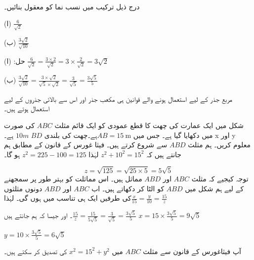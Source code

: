 درج ذیل ترکیب میں نسب نما کو معقول بنائیں۔

(ا)
\(\frac{6}{\sqrt{2}}\)

(ب)
\(\frac{3\sqrt{2}}{\sqrt{10}}\)

حل:
(ا)
\(\frac{6}{\sqrt{2}}=\frac{3\times 2}{\sqrt{2}}=3\times\frac{2}{\sqrt{2}}=3\sqrt{2}\)

(ب)
\(\frac{3\sqrt{2}}{\sqrt{10}}=\frac{3\times\sqrt{2}}{\sqrt{5}\times\sqrt{2}}=\frac{3}{\sqrt{5}}=\frac{3\sqrt{5}}{5}\)

مربع جذر کے لیے استعمال ہونے والے قوانین ہی مکعب جذر اور اس سے بالائی جذروں کے لیے استعمال ہوتے ہیں۔

شکل  میں ایک عمارت کی چھت کا قطع عمودی کو ایک قائم مثلث \(ABC\) کی صورت میں دکھایا گیا ہے۔ جس میں
 \(AB=\SI{15}{\meter}\)ہے۔چھت کی بلندی
 \(BD\) \(10m\) ہے۔ x اور y  معلوم کریں۔
ہم مثلث \(ABD\) سے شروع کرتے ہیں۔ فیثا غورس کے قانون کے مطابق ہم جانتے ہیں کہ
 \(z^{2}+10^{2}=15^{2}\)
لہٰذا \(z^{2}=225-100=125\) ہو گا۔

\[z=\sqrt{125}=\sqrt{25\times 5}=5\sqrt{5}\]
توجہ کیجیے کہ مثلث \(ABC\) اور \(ABD\) مماثل ہیں۔ اس مماثلت کو بہتر طور پر سمجھنے کے لیے ہم  شکل   میں \(ABD\) کو الٹا کر دکھاتے ہیں۔ اب \(ABC\) اور \(ABD\) دونوں مثلثوں کی طرفیں ایک ہی تناسب میں ہوں گی۔ لہٰذا\(\frac{x}{15}=\frac{y}{10}=\frac{15}{z}\)

۔ اور جیسا کہ ہم جانتے ہیں\(\frac{15}{z}=\frac{15}{5\sqrt{5}}=\frac{3}{\sqrt{5}}=\frac{3\sqrt{5}}{5}\)
\(x=15\times\frac{3\sqrt{5}}{5}=9\sqrt{5}\)

\(y=10\times\frac{3\sqrt{5}}{5}=6\sqrt{5}\)

آپ فیثاغورس کے قانون سے مثلث  \(ABC\) میں \(x^{2}=15^{2}+y^{2}\) کی تصدیق کر سکتے ہیں۔

